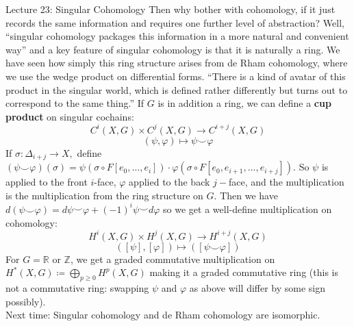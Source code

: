\documentclass[10pt]{article}
\theoremstyle{plain}
\theoremstyle{definition}
\newcommand{\Real}{\mathbb{R}}
\newcommand{\deriv}{d}
\newcommand{\Zint}{\mathbb{Z}}
\begin{document}
\begin{section}{Lecture 23: Singular Cohomology}
Then why bother with cohomology, if it just records the same information and requires one further level of abstraction? Well, ``singular cohomology packages this information in a more natural and convenient way'' and a key feature of singular cohomology is that it is naturally a ring. We have seen how simply this ring structure arises from de Rham cohomology, where we use the wedge product on differential forms. ``There is a kind of avatar of this product in the singular world, which is defined rather differently but turns out to correspond to the same thing.'' If $G$ is in addition a ring, we can define a \textbf{cup product} on singular cochains:
$$C^i(X,G) \times C^j(X,G) \to C^{i+j}(X,G)$$
$$(\psi, \varphi) \mapsto \psi \smile \varphi$$
If $\sigma : \Delta_{i+j} \to X,$ define $(\psi \smile \varphi)(\sigma) = \psi(\sigma \circ F[e_0,\ldots,e_i]) \cdot \varphi(\sigma \circ F[e_0, e_{i+1} , \ldots , e_{i+j}])$. So $\psi$ is applied to the front $i$-face, $\varphi$ applied to the back $j-$face, and the multiplication is the multiplication from the ring structure on $G$. Then we have $\deriv(\psi \smile \varphi) = \deriv \psi \smile \varphi + (-1)^i \psi \smile \deriv \varphi$ so we get a well-define multiplication on cohomology:
$$H^i(X,G) \times H^j(X,G) \to H^{i+j}(X,G) $$
$$([\psi] ,[\varphi]) \mapsto ([\psi \smile \varphi])$$
For $G = \Real$ or $\Zint$, we get a graded commutative multiplication on $H^*(X,G) \coloneqq \bigoplus\limits_{p\geq 0} H^p(X,G)$ making it a graded commutative ring (this is not a commutative ring: swapping $\psi$ and $\varphi$ as above will differ by some sign possibly).\\
Next time: Singular cohomology and de Rham cohomology are isomorphic.
\end{section}
\end{document}
